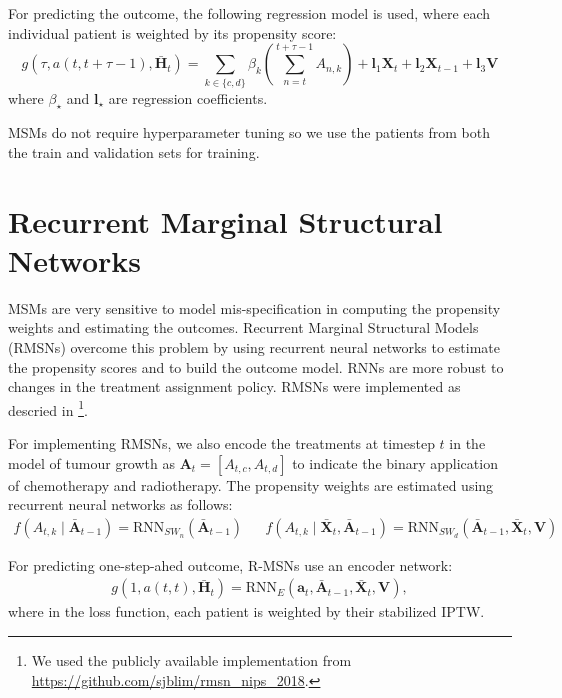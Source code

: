 \documentclass{article} %
\newcommand{\vc}[1]{\mathbf{#1}}
\newcommand{\hist}[1]{\bar{\vc{#1}}}
\begin{document}
	For predicting the outcome, the following regression model is used, where each individual patient is weighted by its propensity score:
	\begin{equation}
	g(\tau, a(t, t+\tau-1),  \hist{H}_t) = \sum_{k\in\{c, d\}} \beta_{k}  (\sum_{n=t}^{t+\tau-1} A_{n,k}) + \vc{l}_1 \vc{X}_t  
	+ \vc{l}_2 \vc{X}_{t-1} +  \vc{l}_3 \vc{V} 
	\end{equation}
	where $\beta_{\star}$ and $\vc{l}_{\star}$ are regression coefficients.
	
	MSMs do not require hyperparameter tuning so we use the patients from both the train and validation sets for training. 
		
	\section {Recurrent Marginal Structural Networks} \label{apx:recurrent_marginal_structural_networks}
	
	MSMs are very sensitive to model mis-specification in computing the propensity weights and estimating the outcomes. Recurrent Marginal Structural Models (RMSNs) \citep{lim2018forecasting} overcome this problem by using recurrent neural networks to estimate the propensity scores and to build the outcome model. RNNs are more robust to changes in the treatment assignment policy. 
	RMSNs were implemented as descried in \cite{lim2018forecasting}\footnote{We used the publicly available implementation from \url{https://github.com/sjblim/rmsn_nips_2018}.}. 
	
	For implementing RMSNs, we also encode the treatments at timestep $t$ in the model of tumour growth as $\vc{A}_t = [A_{t, c}, A_{t, d}]$ to indicate the binary application of chemotherapy and radiotherapy. The propensity weights are estimated using recurrent neural networks as follows:
	\begin{align}
	f(A_{t,k} \mid \hist{A}_{t-1}) = \text{RNN}_{SW_n}(\hist{A}_{t-1}) && f(A_{t,k} \mid  \hist{X}_{t}, \hist{A}_{t-1}) = \text{RNN}_{SW_d}(\hist{A}_{t-1}, \hist{X}_{t}, \vc{V})
	\end{align}
	
	For predicting one-step-ahed outcome, R-MSNs use an encoder network:
	\begin{eqnarray}
	g(1, a(t, t), \hist{H}_t) =  \text{RNN}_{E}(\vc{a}_t, \hist{A}_{t-1}, \hist{X}_{t}, \vc{V}),
	\end{eqnarray}
	where in the loss function, each patient is weighted by their stabilized IPTW. 
	
\end{document}
